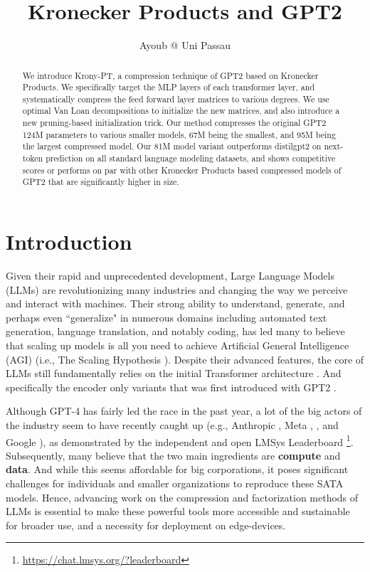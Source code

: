 \documentclass{article}
\title{Kronecker Products and GPT2}
\author{Ayoub @ Uni Passau}
\begin{document}
\maketitle

\begin{abstract}
	We introduce Krony-PT, a compression technique of GPT2 \cite{radford2019language} based on Kronecker Products. We specifically target the MLP layers of each transformer layer, and systematically compress the feed forward layer matrices to various degrees. We use optimal Van Loan decompositions to initialize the new matrices, and also introduce a new pruning-based initialization trick. Our method compresses the original GPT2 124M parameters to various smaller models, 67M being the smallest, and 95M being the largest compressed model. Our 81M model variant outperforms distilgpt2 on next-token prediction on all standard language modeling datasets, and shows competitive scores or performs on par with other Kronecker Products based compressed models of GPT2 that are significantly higher in size. 
\end{abstract}

\newpage

\tableofcontents
\newpage

\section{Introduction}
\label{sec:Introduction}

Given their rapid and unprecedented development, Large Language Models (LLMs) are revolutionizing many industries and changing the way we perceive and interact with machines. Their strong ability to understand, generate, and perhaps even ``generalize" in numerous domains including automated text generation, language translation, and notably coding, has led many to believe that scaling up models is all you need to achieve Artificial General Intelligence (AGI) (i.e., The Scaling Hypothesis \cite{branwen2021scaling}). Despite their advanced features, the core of LLMs still fundamentally relies on the initial Transformer architecture \cite{vaswani2017attention}. And specifically the encoder only variants that was first introduced with GPT2 \cite{radford2019language}. 

Although GPT-4 \cite{achiam2023gpt} has fairly led the race in the past year, a lot of the big actors of the industry seem to have recently caught up (e.g., Anthropic \cite{claude3}, Meta \cite{llama}, \cite{llama3} , and Google \cite{reid2024gemini}), as demonstrated by the independent and open LMSys Leaderboard \footnote{\href{https://chat.lmsys.org/?leaderboard}{https://chat.lmsys.org/?leaderboard}}. Subsequently, many believe that the two main ingredients are \textbf{compute} and \textbf{data}. And while this seems affordable for big corporations, it poses significant challenges for individuals and smaller organizations to reproduce these SATA models. Hence, advancing work on the compression and factorization methods of LLMs is essential to make these powerful tools more accessible and sustainable for broader use, and a necessity for deployment on edge-devices.
\end{document}
